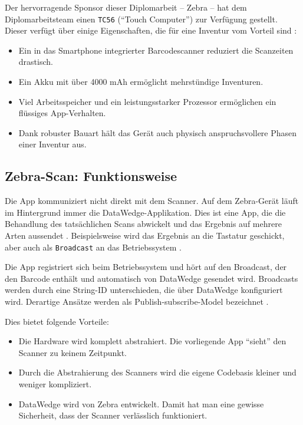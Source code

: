 Der hervorragende Sponsor dieser Diplomarbeit -- Zebra -- hat dem
Diplomarbeitsteam einen \texttt{TC56} (``Touch Computer'') zur Verfügung
gestellt. Dieser verfügt über einige Eigenschaften, die für eine
Inventur vom Vorteil sind \cite{zebra-tc56}:

\begin{itemize}
\tightlist
\item
  Ein in das Smartphone integrierter Barcodescanner reduziert die
  Scanzeiten drastisch.
\item
  Ein Akku mit über 4000 mAh ermöglicht mehrstündige Inventuren.
\item
  Viel Arbeitsspeicher und ein leistungsstarker Prozessor ermöglichen
  ein flüssiges App-Verhalten.
\item
  Dank robuster Bauart hält das Gerät auch physisch anspruchsvollere
  Phasen einer Inventur aus.
\end{itemize}

\hypertarget{zebra-scan-funktionsweise}{%
\subsection{Zebra-Scan:
Funktionsweise}\label{zebra-scan-funktionsweise}}

Die App kommuniziert nicht direkt mit dem Scanner. Auf dem Zebra-Gerät
läuft im Hintergrund immer die DataWedge-Applikation. Dies ist eine App,
die die Behandlung des tatsächlichen Scans abwickelt und das Ergebnis
auf mehrere Arten aussendet \cite{datawedge}. Beispielsweise wird das
Ergebnis an die Tastatur geschickt, aber auch als \texttt{Broadcast} an
das Betriebssystem \cite{broadcast}.

Die App registriert sich beim Betriebssystem und hört auf den Broadcast,
der den Barcode enthält und automatisch von DataWedge gesendet wird.
Broadcasts werden durch eine String-ID unterschieden, die über DataWedge
konfiguriert wird. Derartige Ansätze werden als Publish-subscribe-Model
bezeichnet \cite{Publish-subscribe}.

Dies bietet folgende Vorteile:

\begin{itemize}
\tightlist
\item
  Die Hardware wird komplett abstrahiert. Die vorliegende App ``sieht''
  den Scanner zu keinem Zeitpunkt.
\item
  Durch die Abstrahierung des Scanners wird die eigene Codebasis kleiner
  und weniger kompliziert.
\item
  DataWedge wird von Zebra entwickelt. Damit hat man eine gewisse
  Sicherheit, dass der Scanner verlässlich funktioniert.
\end{itemize}

